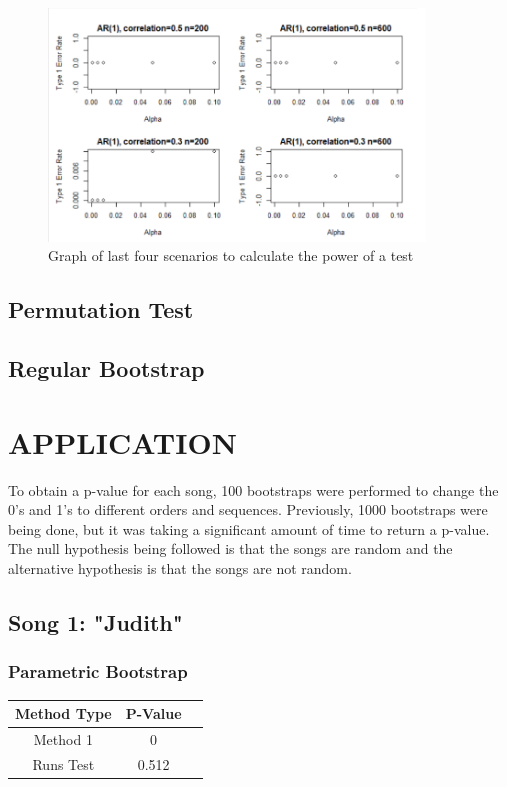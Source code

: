 \documentclass[12pt, letterpaper]{article}
\begin{document}
\begin{figure}[!hb]
\centering
\includegraphics[width=10cm]{PowerGraphs2.png}
\caption{Graph of last four scenarios to calculate the power of a test}
\label{fig: Power Graphs 2}
\end{figure}


\subsection{Permutation Test}
\subsection{Regular Bootstrap}


\section{APPLICATION}
To obtain a p-value for each song, 100 bootstraps were performed to change the 0's and 1's to different orders and sequences.  Previously, 1000 bootstraps were being done, but it was taking a significant amount of time to return a p-value.  The null hypothesis being followed is that the songs are random and the alternative hypothesis is that the songs are not random. 

\subsection{Song 1: "Judith"}

\subsubsection{Parametric Bootstrap}
\begin{tabular}{|c|c|c|}
\hline
\textbf{Method Type} & P-Value \\
\hline
Method 1 & 0 \\
\hline
Runs Test & 0.512 \\ 
\hline
\end{tabular}
\end{document}
